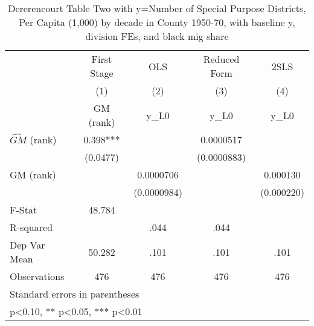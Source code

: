 \begin{table}[htbp]\centering
\def\sym#1{\ifmmode^{#1}\else\(^{#1}\)\fi}
\caption{Dererencourt Table Two with y=Number of Special Purpose Districts, Per Capita (1,000) by decade in County 1950-70, with baseline y, division FEs, and black mig share}
\begin{tabular}{l*{4}{c}}
\toprule
                    & First Stage   &         OLS   &Reduced Form   &        2SLS   \\
                    &\multicolumn{1}{c}{(1)}&\multicolumn{1}{c}{(2)}&\multicolumn{1}{c}{(3)}&\multicolumn{1}{c}{(4)}\\
                    &\multicolumn{1}{c}{GM  (rank)}&\multicolumn{1}{c}{y\_L0}&\multicolumn{1}{c}{y\_L0}&\multicolumn{1}{c}{y\_L0}\\
\midrule
$\hat{GM}$ (rank)   &       0.398***&               &   0.0000517   &               \\
                    &    (0.0477)   &               & (0.0000883)   &               \\
\addlinespace
GM  (rank)          &               &   0.0000706   &               &    0.000130   \\
                    &               & (0.0000984)   &               &  (0.000220)   \\
\midrule
F-Stat              &      48.784   &               &               &               \\
R-squared           &               &        .044   &        .044   &               \\
Dep Var Mean        &      50.282   &        .101   &        .101   &        .101   \\
Observations        &         476   &         476   &         476   &         476   \\
\bottomrule
\multicolumn{5}{l}{\footnotesize Standard errors in parentheses}\\
\multicolumn{5}{l}{\footnotesize * p<0.10, ** p<0.05, *** p<0.01}\\
\end{tabular}
\end{table}

